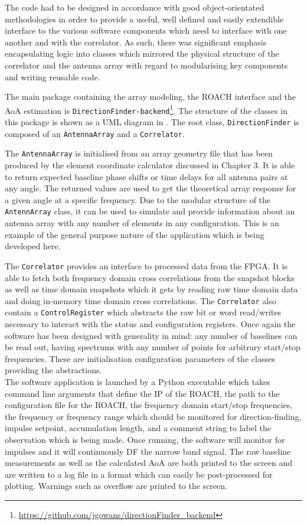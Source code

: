 The code had to be designed in accordance with good object-orientated methodologies in order to provide a useful, well defined and easily extendible interface to the various software components which need to interface with one another and with the correlator. As such, there was significant emphasis encapsulating logic into classes which mirrored the physical structure of the correlator and the antenna array with regard to modularising key components and writing reusable code.

The main package containing the array modeling, the ROACH interface and the AoA estimation is \lstinline{DirectionFinder-backend}\footnote{\url{https://github.com/jgowans/directionFinder_backend}}. The structure of the classes in this package is shown as a UML diagram in . The root class, \lstinline{DirectionFinder} is composed of an \lstinline{AntennaArray} and a \lstinline{Correlator}. 

The \lstinline{AntennaArray} is initialised from an array geometry file that has been produced by the element coordinate calculator discussed in Chapter 3. It is able to return expected baseline phase shifts or time delays for all antenna pairs at any angle. The returned values are used to get the theoretical array response for a given angle at a specific frequency. Due to the modular structure of the \lstinline{AntennArray} class, it can be used to simulate and provide information about an antenna array with any number of elements in any configuration. This is an example of the general purpose nature of the application which is being developed here.

The \lstinline{Correlator} provides an interface to processed data from the FPGA. It is able to fetch both frequency domain cross correlations from the snapshot blocks as well as time domain snapshots which it gets by reading raw time domain data and doing in-memory time domain cross correlations. The \lstinline{Correlator} also contain a \lstinline{ControlRegister} which abstracts the raw bit or word read/writes necessary to interact with the status and configuration registers. Once again the software has been designed with generality in mind: any number of baselines can be read out, having spectrums with any number of points for arbitrary start/stop frequencies. These are initialisation configuration parameters of the classes providing the abstractions.\\

The software application is launched by a Python executable which takes command line arguments that define the IP of the ROACH, the path to the configuration file for the ROACH, the frequency domain start/stop frequencies, the frequency or frequency range which should be monitored for direction-finding, impulse setpoint, accumulation length, and a comment string to label the observation which is being made. Once running, the software will monitor for impulses and it will continuously DF the narrow band signal. The raw baseline measurements as well as the calculated AoA are both printed to the screen and are written to a log file in a format which can easily be post-processed for plotting. Warnings such as overflow are printed to the screen.\\

